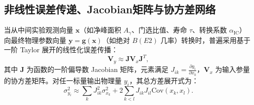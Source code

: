 \subsection{非线性误差传递、Jacobian矩阵与协方差网络}\label{subsec:5-10-2}

当从中间实验观测向量 $\mathbf{x}$（如净峰面积 $A_\gamma$、门选比值、寿命 $\tau$、转换系数 $\alpha_{\mathrm{IC}}$）向最终物理参数向量 $\mathbf{y} = \mathbf{g}(\mathbf{x})$（如绝对 $B(E2)$ 几率）转换时，普遍采用基于一阶 Taylor 展开的线性化误差传播：
\begin{equation}\label{eq:5-10-covariance-prop}
\mathbf{V}_y \approx \mathbf{J} \mathbf{V}_x \mathbf{J}^T,
\end{equation}
其中 $\mathbf{J}$ 为函数的一阶偏导数 Jacobian 矩阵，元素满足 $J_{ik} = \frac{\partial g_i}{\partial x_k}$，$\mathbf{V}_x$ 为输入参量的协方差矩阵。对任一标量输出物理量 $y_i$，其总方差展开式为：
\begin{equation}\label{eq:5-10-var-sum}
\sigma_{y_i}^2 \approx \sum_k J_{ik}^2 \sigma_{x_k}^2 + 2 \sum_{k < l} J_{ik} J_{il} \mathrm{Cov}(x_k, x_l).
\end{equation}

